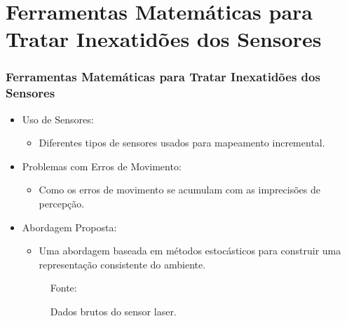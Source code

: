 \documentclass[xcolor=dvipsnames, aspectratio=169]{beamer}
\begin{document}
\section{Ferramentas Matemáticas para Tratar Inexatidões dos Sensores}
  \begin{frame}
  \frametitle{Ferramentas Matemáticas para Tratar Inexatidões dos Sensores}
  \begin{itemize}
      \item Uso de Sensores: 
      \begin{itemize}
        \item Diferentes tipos de sensores usados para mapeamento incremental.
      \end{itemize}
      \item Problemas com Erros de Movimento:
      \begin{itemize}
        \item Como os erros de movimento se acumulam com as imprecisões de percepção.
      \end{itemize}
      \item Abordagem Proposta:
      \begin{itemize}
        \item Uma abordagem baseada em métodos estocásticos para construir uma representação consistente do ambiente.
      \end{itemize}

      \begin{figure}
        \centering
        {Fonte: \cite{buniyamin2011simple}}
        \caption{Dados brutos do sensor laser.}
        \label{fig:1_range_sensor_obstacle}
      \end{figure}
  \end{itemize}
\end{frame}
  
\end{document}
